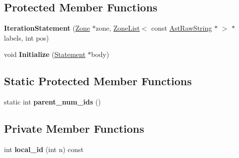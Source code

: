 \subsection*{Protected Member Functions}
\begin{DoxyCompactItemize}
\item 
{\bfseries Iteration\+Statement} (\hyperlink{classv8_1_1internal_1_1_zone}{Zone} $\ast$zone, \hyperlink{classv8_1_1internal_1_1_zone_list}{Zone\+List}$<$ const \hyperlink{classv8_1_1internal_1_1_ast_raw_string}{Ast\+Raw\+String} $\ast$ $>$ $\ast$labels, int pos)\hypertarget{classv8_1_1internal_1_1_iteration_statement_a7eb4203fde9d55c8a422f5f69256f3ad}{}\label{classv8_1_1internal_1_1_iteration_statement_a7eb4203fde9d55c8a422f5f69256f3ad}

\item 
void {\bfseries Initialize} (\hyperlink{classv8_1_1internal_1_1_statement}{Statement} $\ast$body)\hypertarget{classv8_1_1internal_1_1_iteration_statement_a6a313ad237f5b93a69bd3db590872865}{}\label{classv8_1_1internal_1_1_iteration_statement_a6a313ad237f5b93a69bd3db590872865}

\end{DoxyCompactItemize}
\subsection*{Static Protected Member Functions}
\begin{DoxyCompactItemize}
\item 
static int {\bfseries parent\+\_\+num\+\_\+ids} ()\hypertarget{classv8_1_1internal_1_1_iteration_statement_a6d317ae8eb3ad73d6e386770bd4dfb55}{}\label{classv8_1_1internal_1_1_iteration_statement_a6d317ae8eb3ad73d6e386770bd4dfb55}

\end{DoxyCompactItemize}
\subsection*{Private Member Functions}
\begin{DoxyCompactItemize}
\item 
int {\bfseries local\+\_\+id} (int n) const \hypertarget{classv8_1_1internal_1_1_iteration_statement_a8f787f374f66e1a36591d7a6c9e8e8fe}{}\label{classv8_1_1internal_1_1_iteration_statement_a8f787f374f66e1a36591d7a6c9e8e8fe}

\end{DoxyCompactItemize}
